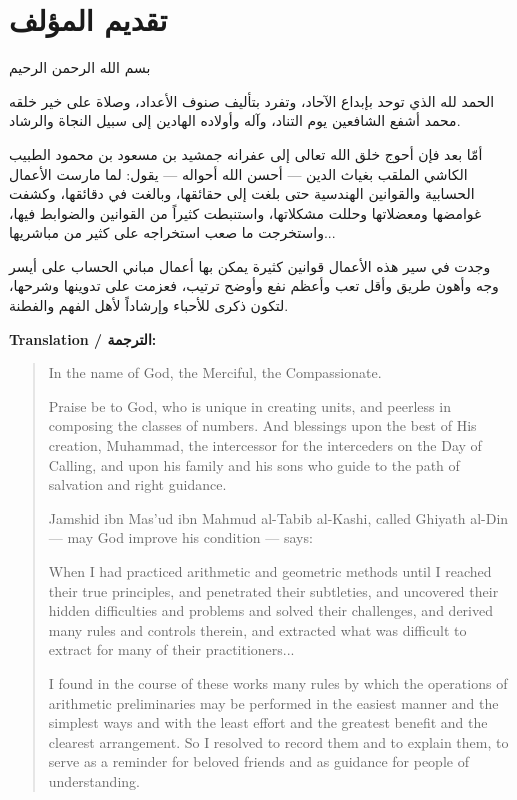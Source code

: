 \documentclass[11pt,a4paper,openany,oneside]{book}
\newcommand{\ar}[1]{{\arabicfont\beginR #1\endR}}
\newcommand{\arHuge}[1]{{\Huge\arabicfont\beginR #1\endR}}
\newenvironment{arabicbox}{%
  \begin{framed}
  \begin{minipage}{\dimexpr\linewidth-2\fboxsep-2\fboxrule\relax}
  \setlength{\parindent}{0pt}
  \linespread{1.3}\selectfont
}{%
  \end{minipage}
  \end{framed}
}
\begin{document}
\chapter*{\ar{تقديم المؤلف}}
\addcontentsline{toc}{chapter}{\ar{تقديم المؤلف}}

\begin{arabicbox}
\begin{center}
\arHuge{بسم الله الرحمن الرحيم}
\end{center}

\vspace{0.5cm}

\ar{الحمد لله الذي توحد بإبداع الآحاد، وتفرد بتأليف صنوف الأعداد، وصلاة على خير خلقه محمد أشفع الشافعين يوم التناد، وآله وأولاده الهادين إلى سبيل النجاة والرشاد.}

\vspace{0.5cm}

\ar{أمّا بعد فإن أحوج خلق الله تعالى إلى عفرانه جمشيد بن مسعود بن محمود الطبيب الكاشي الملقب بغياث الدين — أحسن الله أحواله — يقول: لما مارست الأعمال الحسابية والقوانين الهندسية حتى بلغت إلى حقائقها، وبالغت في دقائقها، وكشفت غوامضها ومعضلاتها وحللت مشكلاتها، واستنبطت كثيراً من القوانين والضوابط فيها، واستخرجت ما صعب استخراجه على كثير من مباشريها...}

\vspace{0.5cm}

\ar{وجدت في سير هذه الأعمال قوانين كثيرة يمكن بها أعمال مباني الحساب على أيسر وجه وأهون طريق وأقل تعب وأعظم نفع وأوضح ترتيب، فعزمت على تدوينها وشرحها، لتكون ذكرى للأحباء وإرشاداً لأهل الفهم والفطنة.}
\end{arabicbox}

\vspace{0.5cm}

\noindent\textbf{Translation / \ar{الترجمة}:}

\begin{quote}
In the name of God, the Merciful, the Compassionate.

Praise be to God, who is unique in creating units, and peerless in composing the classes of numbers. And blessings upon the best of His creation, Muhammad, the intercessor for the interceders on the Day of Calling, and upon his family and his sons who guide to the path of salvation and right guidance.

Jamshid ibn Mas'ud ibn Mahmud al-Tabib al-Kashi, called Ghiyath al-Din --- may God improve his condition --- says:

When I had practiced arithmetic and geometric methods until I reached their true principles, and penetrated their subtleties, and uncovered their hidden difficulties and problems and solved their challenges, and derived many rules and controls therein, and extracted what was difficult to extract for many of their practitioners...

I found in the course of these works many rules by which the operations of arithmetic preliminaries may be performed in the easiest manner and the simplest ways and with the least effort and the greatest benefit and the clearest arrangement. So I resolved to record them and to explain them, to serve as a reminder for beloved friends and as guidance for people of understanding.
\end{quote}
\clearpage
\end{document}
